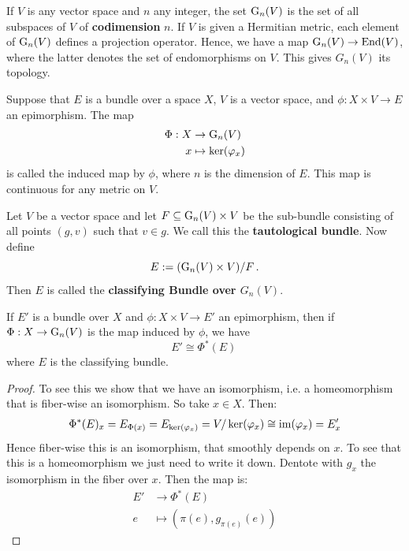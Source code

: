 \begin{definition}\label{def: Grassmann Manifold}
	If $V$ is any vector space and $n$ any integer, the set $\mathrm{G}_n(V)$ is the set of all subspaces of $V$ of \textbf{codimension} $n$. If $V$ is given a Hermitian metric, each element of $\mathrm{G}_n(V)$ defines a projection operator. Hence, we have a map $\mathrm{G}_n(V)\to \operatorname{\mathrm{End}}(V)$, where the latter denotes the set of endomorphisms on $V$. This gives $G_n(V)$ its topology. 
	
	Suppose that $E$ is a bundle over a space $X$, $V$ is a vector space, and $\phi: X\times V \to E$ an epimorphism. The map
	\begin{align*}
		\Phi: X & \to \mathrm{G}_n(V)\\
		x &\mapsto \ker(\varphi_x)
	\end{align*} is called the induced map by $\phi$, where $n$ is the dimension of $E$. This map is continuous for any metric on $V$.
\end{definition}
\begin{definition}\label{def: Classifying Bundle over Grassmanian}
	Let $V$ be a vector space and let $F\subseteq \mathrm{G}_n(V)\times V$ be the sub-bundle consisting of all points $(g,v)$ such that $v\in g$. We call this the \textbf{tautological bundle}. Now define
	\begin{equation*}
		E:= (\mathrm{G}_n(V)\times V)\slash F\,.
	\end{equation*} Then $E$ is called the \textbf{classifying Bundle over $G_n(V)$}.
\end{definition}
\begin{corollary}
	If $E'$ is a bundle over $X$ and $\phi: X\times V\to E'$ an epimorphism, then if $\Phi:X\to \mathrm{G}_n(V)$ is the map induced by $\phi$, we have
	\begin{equation*}
		E'\cong \Phi^*(E)\,
	\end{equation*} where $E$ is the classifying bundle.
\end{corollary}
\begin{proof}
	To see this we show that we have an isomorphism, i.e. a homeomorphism that is fiber-wise an isomorphism.
	So take $x\in X$. Then:
	\begin{align*}
		\Phi^*(E)_x=E_{\Phi(x)}=E_{\ker(\varphi_x)}=V \slash \ker(\varphi_x)\cong \mathrm{im}(\varphi_x)=E'_x
	\end{align*} Hence fiber-wise this is an isomorphism, that smoothly depends on $x$. To see that this is a homeomorphism we just need to write it down. Dentote with $g_x$ the isomorphism in the fiber over $x$. Then the map is:
	\begin{align*}
		E'  & \to \Phi^*(E) \\
		e   &\mapsto (\pi(e),g_{\pi(e)}(e))
	\end{align*}
\end{proof}
